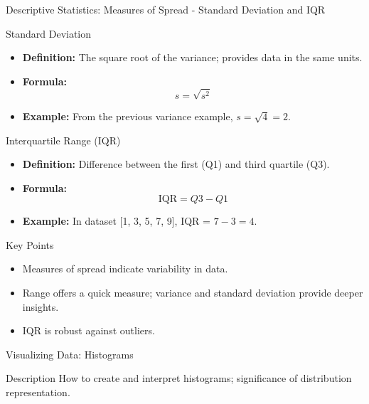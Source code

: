 \documentclass[aspectratio=169]{beamer}
\begin{document}
\begin{frame}[fragile]{Descriptive Statistics: Measures of Spread - Standard Deviation and IQR}
    \begin{block}{Standard Deviation}
        \begin{itemize}
            \item \textbf{Definition:} The square root of the variance; provides data in the same units.
            \item \textbf{Formula:} 
            \[
            s = \sqrt{s^2}
            \]
            \item \textbf{Example:} From the previous variance example, \( s = \sqrt{4} = 2 \).
        \end{itemize}
    \end{block}

    \begin{block}{Interquartile Range (IQR)}
        \begin{itemize}
            \item \textbf{Definition:} Difference between the first (Q1) and third quartile (Q3).
            \item \textbf{Formula:} 
            \[
            \text{IQR} = Q3 - Q1
            \]
            \item \textbf{Example:} In dataset [1, 3, 5, 7, 9], IQR = \(7 - 3 = 4\).
        \end{itemize}
    \end{block}

    \begin{block}{Key Points}
        \begin{itemize}
            \item Measures of spread indicate variability in data.
            \item Range offers a quick measure; variance and standard deviation provide deeper insights.
            \item IQR is robust against outliers.
        \end{itemize}
    \end{block}
\end{frame}

\begin{frame}[fragile]{Visualizing Data: Histograms}
  \begin{block}{Description}
    How to create and interpret histograms; significance of distribution representation.
  \end{block}
\end{frame}
\end{document}

